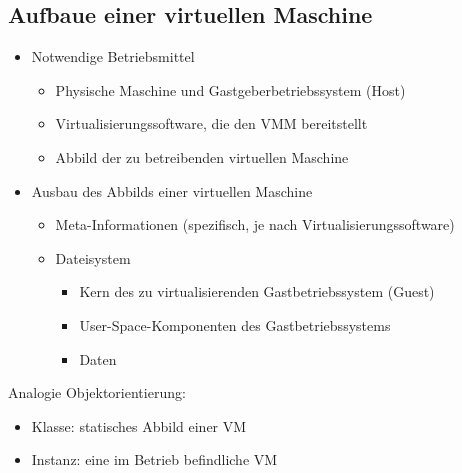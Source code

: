 \documentclass[a4paper,10pt]{scrreprt}
\begin{document}
	\subsection{Aufbaue einer virtuellen Maschine}
	\begin{itemize}
		\item Notwendige Betriebsmittel
		\begin{itemize}
			\item Physische Maschine und Gastgeberbetriebssystem (Host)
			\item Virtualisierungssoftware, die den VMM bereitstellt
			\item Abbild der zu betreibenden virtuellen Maschine
		\end{itemize}
		\item Ausbau des Abbilds einer virtuellen Maschine
		\begin{itemize}
			\item Meta-Informationen (spezifisch, je nach Virtualisierungssoftware)
			\item Dateisystem
			\begin{itemize}
				\item Kern des zu virtualisierenden Gastbetriebssystem (Guest)
				\item User-Space-Komponenten des Gastbetriebssystems
				\item Daten
			\end{itemize}
		\end{itemize}
	\end{itemize}
	Analogie Objektorientierung:
	\begin{itemize}
		\item Klasse: statisches Abbild einer VM
		\item Instanz: eine im Betrieb befindliche VM
	\end{itemize}
\newpage
\end{document}
